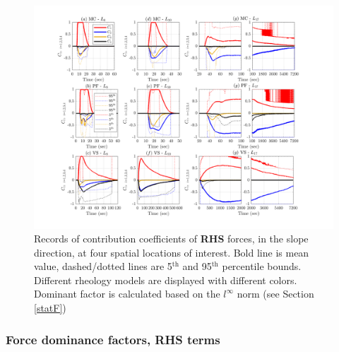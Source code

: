 \documentclass{article}
\begin{document}
\begin{figure}[H]
         \centering
        \includegraphics[width=1\textwidth]{BAF_VolcanDeColima/ForceContrib/Ci1_total.png}
        \caption{Records of contribution coefficients of \textbf{RHS} forces, in the slope direction, at four spatial locations of interest. Bold line is mean value, dashed/dotted lines are 5$^{\mathrm{th}}$ and 95$^{\mathrm{th}}$ percentile bounds. Different rheology models are displayed with different colors. Dominant factor is calculated based on the $l^\infty$ norm (see Section \ref{statF})}
        \label{fig:Colima-Ci_1}
\end{figure}

\subsubsection{Force dominance factors, RHS terms}\label{stat2}
\end{document}
